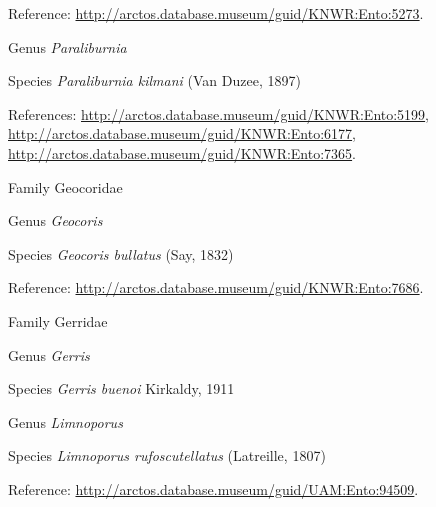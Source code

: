 \documentclass[9pt, article]{memoir}
\begin{document}
\begin{multicols}{2}
\vspace{6pt}Reference: 
\url{http://arctos.database.museum/guid/KNWR:Ento:5273}.

\vspace{6pt}\noindent\hspace{30pt}Genus \textit{Paraliburnia}


\vspace{6pt}\noindent\hspace{36pt}Species \textit{Paraliburnia kilmani} (Van Duzee, 1897)


\vspace{6pt}References: 
\url{http://arctos.database.museum/guid/KNWR:Ento:5199}, 
\url{http://arctos.database.museum/guid/KNWR:Ento:6177}, 
\url{http://arctos.database.museum/guid/KNWR:Ento:7365}.

\vspace{6pt}\noindent\hspace{24pt}Family Geocoridae


\vspace{6pt}\noindent\hspace{30pt}Genus \textit{Geocoris}


\vspace{6pt}\noindent\hspace{36pt}Species \textit{Geocoris bullatus} (Say, 1832)


\vspace{6pt}Reference: 
\url{http://arctos.database.museum/guid/KNWR:Ento:7686}.

\vspace{6pt}\noindent\hspace{24pt}Family Gerridae


\vspace{6pt}\noindent\hspace{30pt}Genus \textit{Gerris}


\vspace{6pt}\noindent\hspace{36pt}Species \textit{Gerris buenoi} Kirkaldy, 1911


\vspace{6pt}\noindent\hspace{30pt}Genus \textit{Limnoporus}


\vspace{6pt}\noindent\hspace{36pt}Species \textit{Limnoporus rufoscutellatus} (Latreille, 1807)


\vspace{6pt}Reference: 
\url{http://arctos.database.museum/guid/UAM:Ento:94509}.


\end{multicols}
\end{document}
